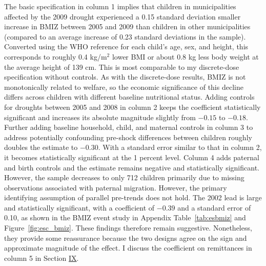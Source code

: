 \documentclass[12pt]{article}
\begin{document}
The basic specification in column 1 implies that children in municipalities affected by the 2009 drought experienced a 0.15 standard deviation smaller increase in BMIZ between 2005 and 2009 than children in other municipalities (compared to an average increase of 0.23 standard deviations in the sample). Converted using the WHO reference for each child's age, sex, and height, this corresponds to roughly 0.4 kg/m$^2$ lower BMI or about 0.8 kg less body weight at the average height of 139 cm. This is most comparable to my discrete-dose specification without controls. As with the discrete-dose results, BMIZ is not monotonically related to welfare, so the economic significance of this decline differs across children with different baseline nutritional status. Adding controls for droughts between 2005 and 2008 in column 2 keeps the coefficient statistically significant and increases its absolute magnitude slightly from $-0.15$ to $-0.18$. Further adding baseline household, child, and maternal controls in column 3 to address potentially confounding pre-shock differences between children roughly doubles the estimate to $-0.30$. With a standard error similar to that in column 2, it becomes statistically significant at the 1 percent level. Column 4 adds paternal and birth controls and the estimate remains negative and statistically significant. However, the sample decreases to only 712 children primarily due to missing observations associated with paternal migration. However, the primary identifying assumption of parallel pre-trends does not hold. The 2002 lead is large and statistically significant, with a coefficient of $-0.39$ and a standard error of 0.10, as shown in the BMIZ event study in Appendix Table~\ref{tab:esbmiz} and Figure~\ref{fig:esc_bmiz}. These findings therefore remain suggestive. Nonetheless, they provide some reassurance because the two designs agree on the sign and approximate magnitude of the effect. I discuss the coefficient on remittances in column 5 in Section \hyperref[sec:IX]{IX}.
\end{document}
